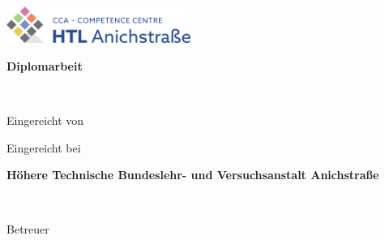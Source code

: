 
\newcommand{\myworktitle}{Diplomarbeit}  %
\newcommand{\myuniversity}{Höhere Technische Bundeslehr- und Versuchsanstalt Anichstraße} %
\newcommand{\mysubmissiontown}{Innsbruck}

\begin{titlepage}

{\sffamily

\begin{center}


\includegraphics[width=60mm]{figures/htl-logo}

\vfill\vfill\vfill
\vspace{1cm}
{\LARGE\bfseries\myworktitle}

\vfill\vfill\vfill

{\Large\bfseries\mytitle} \\
\mysubtitle

\vfill\vfill\vfill
\vfill\vfill\vfill



\vfill\vfill\vfill

\vspace{1cm}
Eingereicht von

{\bfseries\large\myauthor}
\vfill\vfill\vfill

\vspace{0.5cm}
Eingereicht bei

\vfill

{\bfseries\large\myuniversity}
\vfill

\myinstitute\\

\vfill\vfill\vfill

\vspace{0.5cm}
Betreuer

\mysupervisor




\end{center}}
\end{titlepage}
